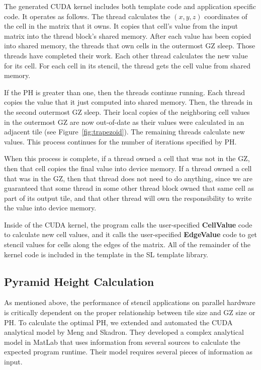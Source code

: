 \documentclass{sig-alternate}
\begin{document}
The generated CUDA kernel includes both template code and application
specific code.  It operates as follows.  The thread calculates the $(x, y,
z)$ coordinates of the cell in the matrix that it owns.  It copies that
cell's value from the input matrix into the thread block's shared memory.
After each value has been copied into shared memory, the threads that own
cells in the outermost GZ sleep.  Those threads have completed their work.
Each other thread calculates the new value for its cell.  For each cell in
its stencil, the thread gets the cell value from shared memory.

If the PH is greater than one, then the threads continue running.  Each
thread copies the value that it just computed into shared memory.  Then, the
threads in the second outermost GZ sleep.  Their local copies of the
neighboring cell values in the outermost GZ are now out-of-date as their
values were calculated in an adjacent tile (see Figure~\ref{fig:trapezoid}).
The remaining threads calculate new values.  This process continues for the
number of iterations specified by PH.

When this process is complete, if a thread owned a cell that was not in the
GZ, then that cell copies the final value into device memory.  If a thread
owned a cell that was in the GZ, then that thread does not need to do
anything, since we are guaranteed that some thread in some other thread block
owned that same cell as part of its output tile, and that other thread will
own the responsibility to write the value into device memory.

Inside of the CUDA kernel, the program calls the user-specified {\bf
  CellValue} code to calculate new cell values, and it calls the
user-specified {\bf EdgeValue} code to get stencil values for cells along the
edges of the matrix.  All of the remainder of the kernel code is included in
the template in the SL template library.

\subsection{Pyramid Height Calculation}

As mentioned above, the performance of stencil applications on parallel
hardware is critically dependent on the proper relationship between tile size
and GZ size or PH.  To calculate the optimal PH, we extended and automated
the CUDA analytical model by Meng and Skadron.  They developed a complex
analytical model in MatLab that uses information from several sources to
calculate the expected program runtime.  Their model requires several pieces
of information as input.
\end{document}
